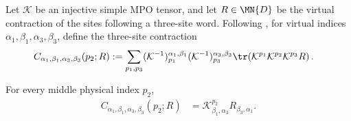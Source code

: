 \begin{definition}
    \label{def:mpdo_inverse_map_three_site_contraction}
    \leanok
    Let $\mathcal K$ be an injective simple MPO tensor, and let $R\in\MN{D}$ be
    the virtual contraction of the sites following a three-site word. Following
    \cite[Appendix~C.2, lines~1415--1438]{Cirac2016MPDO_arXiv}, for virtual
    indices $\alpha_1,\beta_1,\alpha_3,\beta_3$, define the three-site
    contraction
    \begin{align}
        C_{\alpha_1,\beta_1,\alpha_3,\beta_3}(p_2;R)
         & :=
        \sum_{p_1,p_3}
        (\mathcal K^{-1})^{\alpha_1,\beta_1}_{p_1}
        (\mathcal K^{-1})^{\alpha_3,\beta_3}_{p_3}
        \tr\!\left(\mathcal K^{p_1}\mathcal K^{p_2}\mathcal K^{p_3}R\right).
        \label{eq:rfp_inverse_contraction}
    \end{align}
\end{definition}

\begin{lemma}
    \label{thm:mpdo_inverse_map_three_site_contraction}
    \leanok
    For every middle physical index $p_2$,
    \begin{align}
        C_{\alpha_1,\beta_1,\alpha_3,\beta_3}(p_2;R)
         & =\mathcal K^{p_2}_{\beta_1,\alpha_3}
        R_{\beta_3,\alpha_1}.
        \label{eq:rfp_inverse_contraction_eval}
    \end{align}
\end{lemma}

